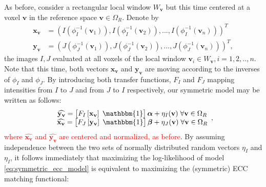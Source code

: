 
As before, consider a rectangular local window $W_{\mathbf{v}}$ but this time centered at a voxel $\mathbf{v}$ in the reference space $\mathbf{v}\in\Omega_{R}$. Denote by
\begin{align*}
    \mathbf{x}_{\mathbf{v}} &= \left(I(\phi_{I}^{-1}(\mathbf{v}_{1})), I(\phi_{I}^{-1}(\mathbf{v}_{2})), ..., I(\phi_{I}^{-1}(\mathbf{v}_{n}))\right)^{T}\\
    \mathbf{y}_{\mathbf{v}} &= \left(J(\phi_{J}^{-1}(\mathbf{v}_{1})), J(\phi_{J}^{-1}(\mathbf{v}_{2})), ..., J(\phi_{J}^{-1}(\mathbf{v}_{n}))\right)^{T},
\end{align*}
the images $I, J$ evaluated at all voxels of the local window $\mathbf{v}_{i}\in W_{\mathbf{v}}, i=1, 2, .., n$. Note that this time, both vectors $\mathbf{x}_{\mathbf{v}}$ and $\mathbf{y}_{\mathbf{v}}$ are moving according to the inverses of $\phi_{I}$ and $\phi_{J}$. By introducing both transfer functions, $F_{I}$ and $F_{J}$ mapping intensities from $I$ to $J$ and from $J$ to $I$ respectively, our symmetric model may be written as follows:
\begin{equation}\label{eq:symmetric_ecc_model}
    \begin{array}{ccccc}
        \widehat{\mathbf{y_v}} = \left[F_{I}\left[\mathbf{x}_{\mathbf{v}}\right] \; \mathbbm{1}\right]\boldsymbol{\alpha} + \eta_{I}(\mathbf{v}) \; \forall \mathbf{v}\in\Omega_{R}\\
        \widehat{\mathbf{x_v}} = \left[F_{J}\left[\mathbf{y}_{\mathbf{v}}\right] \; \mathbbm{1}\right]\boldsymbol{\beta} + \eta_{J}(\mathbf{v}) \; \forall \mathbf{v}\in\Omega_{R}\\
    \end{array},
\end{equation}
\textcolor{red}{where $\widehat{\mathbf{x_v}}$ and $\widehat{\mathbf{y_v}}$ are centered and normalized, as before}. By assuming independence between the two sets of normally distributed random vectors $\eta_{I}$ and $\eta_{I}$, it follows immediately that maximizing the log-likelihood of model \eqref{eq:symmetric_ecc_model} is equivalent to maximizing the (symmetric) ECC matching functional:
